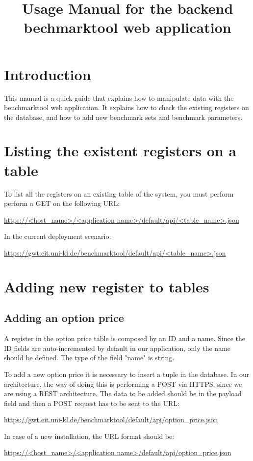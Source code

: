 \documentclass[11pt,a4paper]{article}
\title{Usage Manual for the backend bechmarktool web application}
\begin{document}
\maketitle
\tableofcontents

\section{Introduction}
This manual is a quick guide that explains how to manipulate data with the benchmarktool web application.
It explains how to check the existing registers on the database, and how to add new benchmark sets and benchmark parameters. 


\section{Listing the existent registers on a table}
To list all the registers on an existing table of the system, you must perform perform a GET on the following URL:

\noindent\url{https://<host_name>/<application name>/default/api/<table_name>.json}

In the current deployment scenario:

\noindent\url{https://gwt.eit.uni-kl.de/benchmarktool/default/api/<table_name>.json}

\section{Adding new register to tables}
\subsection{Adding an option price}
A register in the option price table is composed by an ID and a name. 
Since the ID fields are auto-incremented by default in our application, only the name should be defined. 
The type of the field "name" is string.

To add a new option price it is necessary to insert a tuple in the database.
In our architecture, the way of doing this is performing a POST via HTTPS, since we are using a REST architecture.
The data to be added should be in the payload field and then a POST request has to be sent to the URL: 

\noindent\url{https://gwt.eit.uni-kl.de/benchmarktool/default/api/option_price.json}

In case of a new installation, the URL format should be:

\noindent\url{https://<host_name>/<application name>/default/api/option_price.json}
\end{document}
